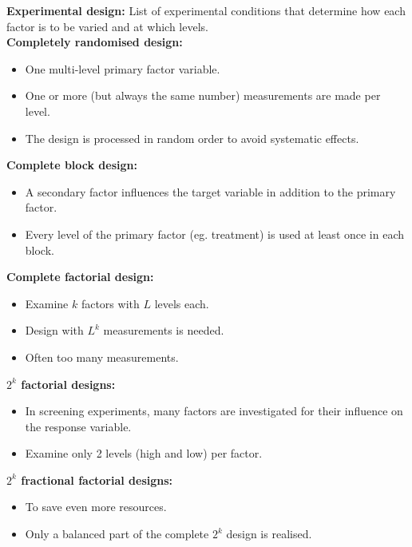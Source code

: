 \textbf{Experimental design:} List of experimental conditions that determine how each factor is to be varied and at which levels.\\

\textbf{Completely randomised design:}
\begin{itemize}
  \item One multi-level primary factor variable.
  \item One or more (but always the same number) measurements are made per level.
  \item The design is processed in random order to avoid systematic effects.
\end{itemize}

\textbf{Complete block design:}
\begin{itemize}
  \item A secondary factor influences the target variable in addition to the primary factor.
  \item Every level of the primary factor (eg. treatment) is used at least once in each block.
\end{itemize}

\textbf{Complete factorial design:}
\begin{itemize}
  \item Examine $k$ factors with $L$ levels each.
  \item Design with $L^k$ measurements is needed.
  \item Often too many measurements.
\end{itemize}

\textbf{$2^k$ factorial designs:}
\begin{itemize}
  \item In screening experiments, many factors are investigated for their influence on the response variable.
  \item Examine only 2 levels (high and low) per factor.
\end{itemize}

\textbf{$2^k$ fractional factorial designs:}
\begin{itemize}
  \item To save even more resources.
  \item Only a balanced part of the complete $2^k$ design is realised.
\end{itemize}

